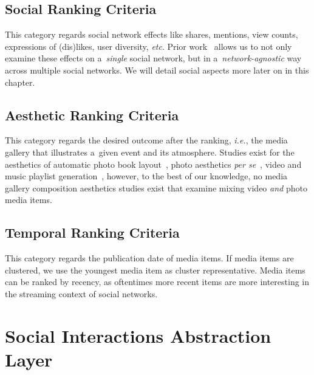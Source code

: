 \subsection{Social Ranking Criteria}

This category regards social network effects like shares, mentions,
view counts, expressions of (dis)likes, user diversity, \emph{etc}.
Prior work~\cite{khrouf2012aggregatingsocialmedia}
allows us to not only examine these effects
on a~\emph{single} social network,
but in a~\emph{network-agnostic} way across multiple social networks.
We will detail social aspects more later on in this chapter.

\subsection{Aesthetic Ranking Criteria}

This category regards the desired outcome after the ranking, \emph{i.e.},
the media gallery that illustrates a~given event and its atmosphere.
Studies exist for the aesthetics of
automatic photo book layout~\cite{sandhaus2011photobook},
photo aesthetics \emph{per se}~\cite{obrador2012photoaesthetics},
video and music playlist generation~\cite{knees2006musicplaylist,davidson2010videorecommendation},
however, to the best of our knowledge,
no media gallery composition aesthetics studies exist
that examine mixing video \emph{and} photo media items.

\subsection{Temporal Ranking Criteria}

This category regards the publication date of media items.
If media items are clustered, we use the youngest media item
as cluster representative.
Media items can be ranked by recency, as oftentimes more recent items
are more interesting in the streaming context of social networks.

\section{Social Interactions Abstraction Layer}

